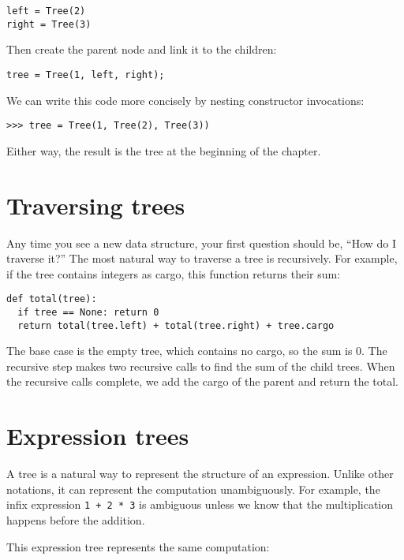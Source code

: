 \beforeverb
\begin{verbatim}
left = Tree(2)
right = Tree(3)
\end{verbatim}
\afterverb
%
Then create the parent node and link it to the children:

\beforeverb
\begin{verbatim}
tree = Tree(1, left, right);
\end{verbatim}
\afterverb
%
We can write this code more concisely by nesting constructor
invocations:

\beforeverb
\begin{verbatim}
>>> tree = Tree(1, Tree(2), Tree(3))
\end{verbatim}
\afterverb
%
Either way, the result is the tree at the beginning of the
chapter.


\section {Traversing trees}

Any time you see a new data structure, your first
question should be, ``How do I traverse it?''  The most natural
way to traverse a tree is recursively.  For example, if the
tree contains integers as cargo, this function returns their sum:

\beforeverb
\begin{verbatim}
def total(tree):
  if tree == None: return 0
  return total(tree.left) + total(tree.right) + tree.cargo
\end{verbatim}
\afterverb
%
The base case is the empty tree, which contains no cargo, so
the sum is 0.
The recursive step
makes two recursive calls to find the sum of the child trees.
When the recursive calls complete,
we add the cargo of the parent and return the
total.


\section {Expression trees}

A tree is a natural way to represent the structure of an expression.
Unlike other notations, it can represent the computation
unambiguously.  For example, the infix expression {\tt 1 + 2 * 3} is
ambiguous unless we know that the multiplication happens before the
addition.

This expression tree represents the same computation:

